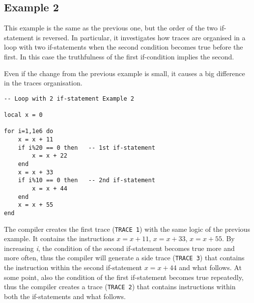 \newpage

\subsection{Example 2}
\label{2-if-example2}
This example is the same as the previous one, but the order of the two if-statement is reversed. In particular, it investigates how traces are organised in a loop with two if-statements when the second condition  becomes true before the first. In  this case the truthfulness of the first if-condition implies the second. 

Even if the change from the previous example is small, it causes a big difference in the traces organisation.

\begin{mdframed}[style=LuaStyleFrame]
\begin{lstlisting}[style=LuaStyle]
-- Loop with 2 if-statement Example 2

local x = 0

for i=1,1e6 do
	x = x + 11
	if i%20 == 0 then   -- 1st if-statement
		x = x + 22
	end
	x = x + 33
	if i%10 == 0 then   -- 2nd if-statement
		x = x + 44
	end
	x = x + 55
end
\end{lstlisting}
\end{mdframed}

\noindent
The compiler creates the first trace (\texttt{TRACE 1}) with the same logic of the previous example. It contains the instructions $x=x+11$, $x=x+33$, $x=x+55$. By increasing \textit{i}, the condition of the second if-statement becomes true more and more often, thus the compiler will generate a side trace (\texttt{TRACE 3}) that contains the instruction within the second if-statement $x=x+44$ and what follows. At some point, also the condition of the first if-statement becomes true repeatedly, thus the compiler creates a trace (\texttt{TRACE 2}) that contains instructions within both the if-statements and what follows.

